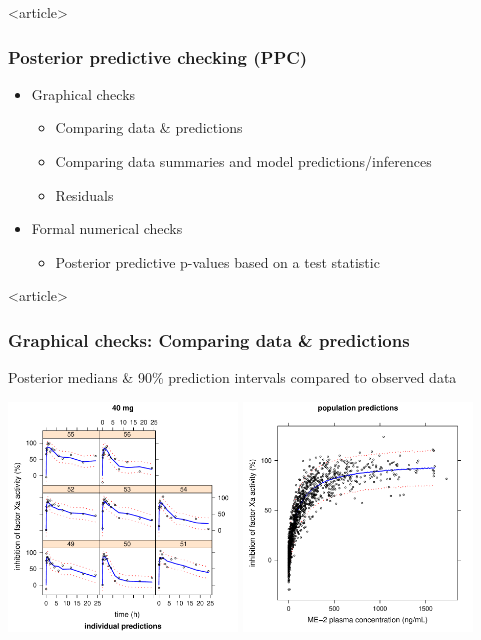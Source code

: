 \documentclass[handout]{beamer}
\begin{document}
\begin{frame}<article>
  \frametitle{Posterior predictive checking (PPC)}
  
  \begin{itemize}
  \item Graphical checks
    \begin{itemize}
    \item Comparing data \& predictions
    \item Comparing data summaries and model predictions/inferences
    \item Residuals
    \end{itemize}
  \item Formal numerical checks
    \begin{itemize}
    \item Posterior predictive p-values based on a test statistic
    \end{itemize}
  \end{itemize}

\end{frame}

\begin{frame}<article>
  \frametitle{Graphical checks: Comparing data \& predictions}
  
    Posterior medians \& 90\% prediction intervals compared to
    observed data
  \begin{center}
    \includegraphics[width=2.4in,trim=0.2in 0 0
    0,clip]{graphics/me2HandsOn2Plots011.pdf}
    \includegraphics[width=2.4in,trim=0.2in 0 0
    0,clip]{graphics/me2HandsOn2Plots024.pdf}
  \end{center}

\end{frame}
\end{document}
